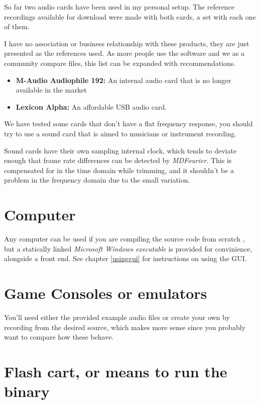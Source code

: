 \documentclass[10pt,a4paper]{report}
\begin{document}
So far two audio cards have been used in my personal setup. The reference recordings available for download were made with both cards, a set with each one of them.

I have no association or business relationship with these products, they are just presented as the references used. As more people use the software and we as a community compare files, this list can be expanded with recommendations.

\begin{itemize}
	\item \textbf{M-Audio Audiophile 192:} An internal audio card that is no longer available in the market \cite{maudio}
	\item \textbf{Lexicon Alpha:} An affordable USB audio card. \cite{lexicon}
\end{itemize}

We have tested some cards that don't have a flat frequency response, you should try to use a sound card that is aimed to musicians or instrument recording.

Sound cards have their own sampling internal clock, which tends to deviate enough that frame rate differences can be detected by \textit{MDFourier}. This is compensated for in the time domain while trimming, and it shouldn't be a problem in the frequency domain due to the small variation. \cite{SoundCardClock}

\section{Computer}

Any computer can be used if you are compiling the source code from scratch \cite{sourcecode}, but a statically linked \textit{Microsoft Windows executable} is provided for convinience, alongside a front end. See chapter \ref{usinggui} for instructions on using the GUI.

\section{Game Consoles or emulators}

You'll need either the provided example audio files or create your own by recording from the desired source, which makes more sense since you probably want to compare how these behave.

\section{Flash cart, or means to run the binary}
\end{document}
